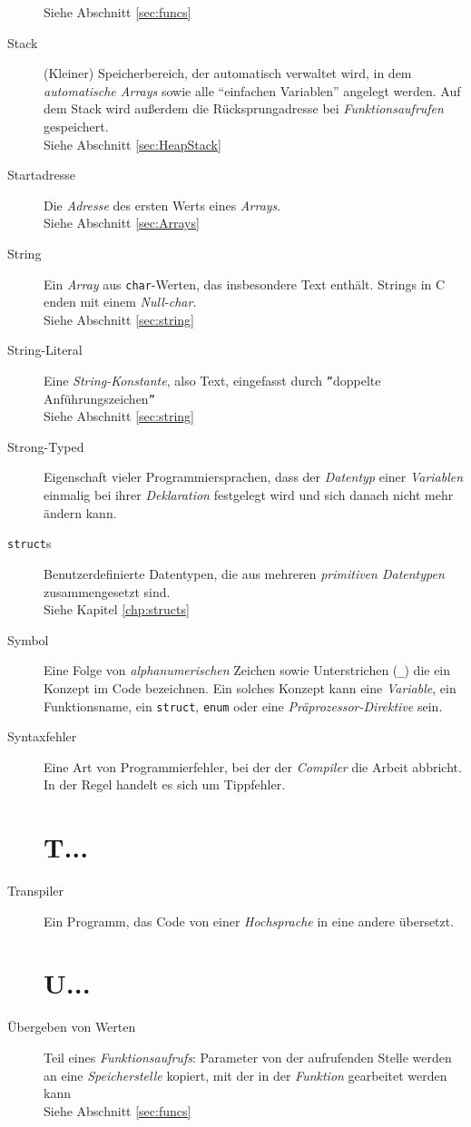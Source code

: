 \begin{appendices}
\begin{description}
	Siehe Abschnitt \ref{sec:funcs}
\item[Stack] (Kleiner) Speicherbereich, der automatisch verwaltet wird, \ie in dem \ua
	\emph{automatische Arrays} sowie alle \enquote{einfachen Variablen} angelegt werden. Auf dem Stack
	wird außerdem die Rücksprungadresse bei \emph{Funktionsaufrufen} gespeichert.\\
	Siehe Abschnitt \ref{sec:HeapStack}
\item[Startadresse] Die \emph{Adresse} des ersten Werts eines \emph{Arrays}.\\
	Siehe Abschnitt \ref{sec:Arrays}
\item[String] Ein \emph{Array} aus \texttt{char}-Werten, das insbesondere Text enthält. Strings
	in C enden mit einem \emph{Null-char}.\\
	Siehe Abschnitt \ref{sec:string}
\item[String-Literal] Eine \emph{String-Konstante}, also Text, eingefasst durch \texttt{''}doppelte
	Anführungszeichen\texttt{''}\\
	Siehe Abschnitt \ref{sec:string}
\item[Strong-Typed] Eigenschaft vieler Programmiersprachen, dass der \emph{Datentyp} einer
	\emph{Variablen} einmalig bei ihrer \emph{Deklaration} festgelegt wird und sich danach nicht mehr
	ändern kann.
\item[\texttt{struct}s] Benutzerdefinierte Datentypen, die aus mehreren 
	\emph{primitiven Datentypen} zusammengesetzt sind.\\
	Siehe Kapitel \ref{chp:structs}
\item[Symbol] Eine Folge von \emph{alphanumerischen} Zeichen sowie Unterstrichen (\texttt{\_}) die
	ein Konzept im Code bezeichnen. Ein solches Konzept kann \eg eine \emph{Variable}, ein
	Funktionsname, ein \texttt{struct}, \texttt{enum} oder eine 
	\emph{Präprozessor-Direktive} sein.
\item[Syntaxfehler] Eine Art von Programmierfehler, bei der der \emph{Compiler} die Arbeit abbricht. In
	der Regel handelt es sich um Tippfehler.

\section*{T...}
\item[Transpiler] Ein Programm, das Code von einer \emph{Hochsprache} in eine andere übersetzt.

\section*{U...}
\item[Übergeben von Werten] Teil eines \emph{Funktionsaufrufs}: Parameter von der aufrufenden Stelle
	werden an eine \emph{Speicherstelle} kopiert, mit der in der \emph{Funktion} gearbeitet werden kann
	\\
	Siehe Abschnitt \ref{sec:funcs}
	

\end{description}
\end{appendices}
